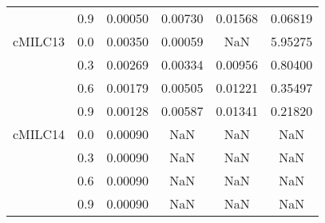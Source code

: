 \begin{longtable}{cccccc}
        & 0.9 & 0.00050 & 0.00730 & 0.01568 & 0.06819 \\
cMILC13 & 0.0 & 0.00350 & 0.00059 & NaN & 5.95275 \\
        & 0.3 & 0.00269 & 0.00334 & 0.00956 & 0.80400 \\
        & 0.6 & 0.00179 & 0.00505 & 0.01221 & 0.35497 \\
        & 0.9 & 0.00128 & 0.00587 & 0.01341 & 0.21820 \\
cMILC14 & 0.0 & 0.00090 & NaN & NaN & NaN \\
        & 0.3 & 0.00090 & NaN & NaN & NaN \\
        & 0.6 & 0.00090 & NaN & NaN & NaN \\
        & 0.9 & 0.00090 & NaN & NaN & NaN \\
\end{longtable}
